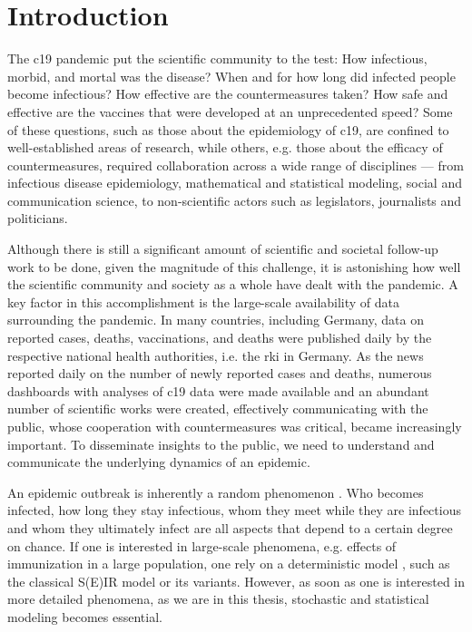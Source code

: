 \chapter{Introduction}
\label{cha:introduction}

The \gls{c19} pandemic put the scientific community to the test: How infectious, morbid, and mortal was the disease? When and for how long did infected people become infectious? How effective are the countermeasures taken? How safe and effective are the vaccines that were developed at an unprecedented speed? Some of these questions, such as those about the epidemiology of \acrshort{c19}, are confined to well-established areas of research, while others, e.g. those about the efficacy of countermeasures, required collaboration across a wide range of disciplines --- from infectious disease epidemiology, mathematical and statistical modeling, social and communication science, to non-scientific actors such as legislators, journalists and politicians.

Although there is still a significant amount of scientific and societal follow-up work to be done, given the magnitude of this challenge, it is astonishing how well the scientific community and society as a whole have dealt with the pandemic. A key factor in this accomplishment is the large-scale availability of data surrounding the pandemic. In many countries, including Germany, data on reported cases, deaths, vaccinations, and deaths were published daily by the respective national health authorities, i.e. the \gls{rki} \citep{RobertKoch-Institut2022SARSCoV2,RobertKoch-Institut2021COVID19Hospitalisierungen} in Germany. 
As the news reported daily on the number of newly reported cases and deaths, numerous dashboards with analyses of \acrshort{c19} data were made available and an abundant number of scientific works were created, effectively communicating with the public, whose cooperation with countermeasures was critical, became increasingly important. To disseminate insights to the public, we need to understand and communicate the underlying dynamics of an epidemic.

An epidemic outbreak is inherently a random phenomenon \citep{Diekmann2013Mathematical}. Who becomes infected, how long they stay infectious, whom they meet while they are infectious and whom they ultimately infect are all aspects that depend to a certain degree on chance. If one is interested in large-scale phenomena, e.g. effects of immunization in a large population, one rely on a deterministic model \citep{Britton2019Stochastic}, such as the classical S(E)IR model \citep{Kermack1927Contribution} or its variants. However, as soon as one is interested in more detailed phenomena, as we are in this thesis, stochastic and statistical modeling becomes essential. 


